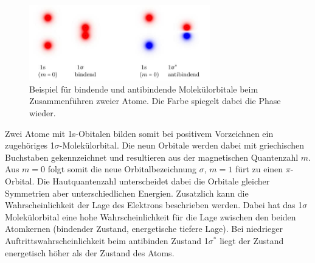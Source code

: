 \begin{figure}
    \center
    \includegraphics[width=0.7\textwidth]{bilder/mol_orbitale.jpg}
    \caption{Beispiel für bindende und antibindende Molekülorbitale beim Zusammenführen zweier Atome.
    Die Farbe spiegelt dabei die Phase wieder.}
\end{figure}
Zwei Atome mit 1s-Obitalen bilden somit bei positivem Vorzeichnen ein zugehöriges 1$\sigma$-Molekülorbital. Die neun Orbitale werden dabei mit
griechischen Buchstaben gekennzeichnet und resultieren aus der magnetischen Quantenzahl $m$. Aus $m=0$ folgt somit die neue Orbitalbezeichnung 
$\sigma$, $m=1$ fürt zu einen $\pi$-Orbital.
Die Hautquantenzahl unterscheidet dabei die Orbitale gleicher Symmetrien aber unterschiedlichen Energien.
Zusatzlich kann die Wahrscheinlichkeit der Lage des Elektrons beschrieben werden. Dabei hat das 1$\sigma$ Molekülorbital eine hohe Wahrscheinlichkeit für die Lage zwischen
den beiden Atomkernen (bindender Zustand, energetische tiefere Lage). Bei niedrieger Auftrittswahrscheinlichkeit beim
antibinden Zustand 1$\sigma^*$ liegt der Zustand energetisch höher als der Zustand des Atoms.









